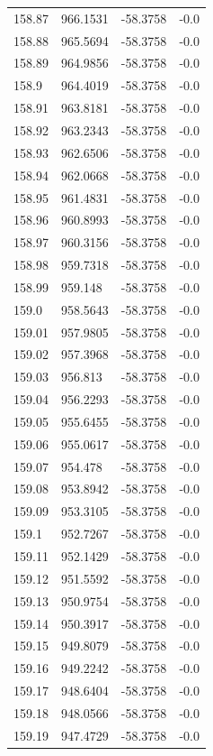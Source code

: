 \begin{table}[H]
\begin{tabular}{llll}
158.87 & 966.1531 & -58.3758 & -0.0 \\
158.88 & 965.5694 & -58.3758 & -0.0 \\
158.89 & 964.9856 & -58.3758 & -0.0 \\
158.9 & 964.4019 & -58.3758 & -0.0 \\
158.91 & 963.8181 & -58.3758 & -0.0 \\
158.92 & 963.2343 & -58.3758 & -0.0 \\
158.93 & 962.6506 & -58.3758 & -0.0 \\
158.94 & 962.0668 & -58.3758 & -0.0 \\
158.95 & 961.4831 & -58.3758 & -0.0 \\
158.96 & 960.8993 & -58.3758 & -0.0 \\
158.97 & 960.3156 & -58.3758 & -0.0 \\
158.98 & 959.7318 & -58.3758 & -0.0 \\
158.99 & 959.148 & -58.3758 & -0.0 \\
159.0 & 958.5643 & -58.3758 & -0.0 \\
159.01 & 957.9805 & -58.3758 & -0.0 \\
159.02 & 957.3968 & -58.3758 & -0.0 \\
159.03 & 956.813 & -58.3758 & -0.0 \\
159.04 & 956.2293 & -58.3758 & -0.0 \\
159.05 & 955.6455 & -58.3758 & -0.0 \\
159.06 & 955.0617 & -58.3758 & -0.0 \\
159.07 & 954.478 & -58.3758 & -0.0 \\
159.08 & 953.8942 & -58.3758 & -0.0 \\
159.09 & 953.3105 & -58.3758 & -0.0 \\
159.1 & 952.7267 & -58.3758 & -0.0 \\
159.11 & 952.1429 & -58.3758 & -0.0 \\
159.12 & 951.5592 & -58.3758 & -0.0 \\
159.13 & 950.9754 & -58.3758 & -0.0 \\
159.14 & 950.3917 & -58.3758 & -0.0 \\
159.15 & 949.8079 & -58.3758 & -0.0 \\
159.16 & 949.2242 & -58.3758 & -0.0 \\
159.17 & 948.6404 & -58.3758 & -0.0 \\
159.18 & 948.0566 & -58.3758 & -0.0 \\
159.19 & 947.4729 & -58.3758 & -0.0 \\

\end{tabular}
\end{table}
